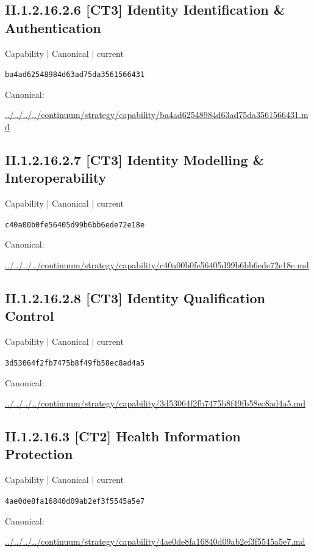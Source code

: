 \documentclass[10pt,a4paper]{article}
\begin{document}
\subsection*{II.1.2.16.2.6 [CT3] Identity Identification \& Authentication}
\label{element-ba4ad62548984d63ad75da3561566431}
{\small Capability | Canonical | current}\par
\texttt{ba4ad62548984d63ad75da3561566431}\par
Canonical: \par
{\footnotesize\url{../../../../continuum/strategy/capability/ba4ad62548984d63ad75da3561566431.md}}\par
\subsection*{II.1.2.16.2.7 [CT3] Identity Modelling \& Interoperability}
\label{element-c40a00b0fe56405d99b6bb6ede72e18e}
{\small Capability | Canonical | current}\par
\texttt{c40a00b0fe56405d99b6bb6ede72e18e}\par
Canonical: \par
{\footnotesize\url{../../../../continuum/strategy/capability/c40a00b0fe56405d99b6bb6ede72e18e.md}}\par
\subsection*{II.1.2.16.2.8 [CT3] Identity Qualification Control}
\label{element-3d53064f2fb7475b8f49fb58ec8ad4a5}
{\small Capability | Canonical | current}\par
\texttt{3d53064f2fb7475b8f49fb58ec8ad4a5}\par
Canonical: \par
{\footnotesize\url{../../../../continuum/strategy/capability/3d53064f2fb7475b8f49fb58ec8ad4a5.md}}\par
\subsection*{II.1.2.16.3 [CT2] Health Information Protection}
\label{element-4ae0de8fa16840d09ab2ef3f5545a5e7}
{\small Capability | Canonical | current}\par
\texttt{4ae0de8fa16840d09ab2ef3f5545a5e7}\par
Canonical: \par
{\footnotesize\url{../../../../continuum/strategy/capability/4ae0de8fa16840d09ab2ef3f5545a5e7.md}}\par
\end{document}
